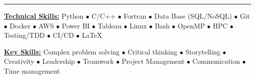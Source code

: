 \vspace*{-8mm}

\begin{center}
    \par\rule{1.0\textwidth}{0.6pt}
\end{center}
\vspace*{-6mm}


\begin{multicols}{2}
    \begin{spacing}{1}
        \href{.}{\bf Technical Skills:}
        Python $\bullet$ C/C++ $\bullet$ Fortran $\bullet$ Data Base (SQL/NoSQL) $\bullet$ Git $\bullet$ Docker $\bullet$ AWS $\bullet$ Power BI $\bullet$ Tableau $\bullet$ Linux $\bullet$ Bash $\bullet$ OpenMP $\bullet$ HPC $\bullet$ Testing/TDD $\bullet$ CI/CD $\bullet$ \LaTeX~ %

        \href{.}{\bf Key Skills:}
        Complex problem solving $\bullet$ Critical thinking $\bullet$ Storytelling $\bullet$ Creativity $\bullet$ Leadership $\bullet$ Teamwork $\bullet$ Project Management $\bullet$ Communication $\bullet$ Time management
    \end{spacing}
\end{multicols}


